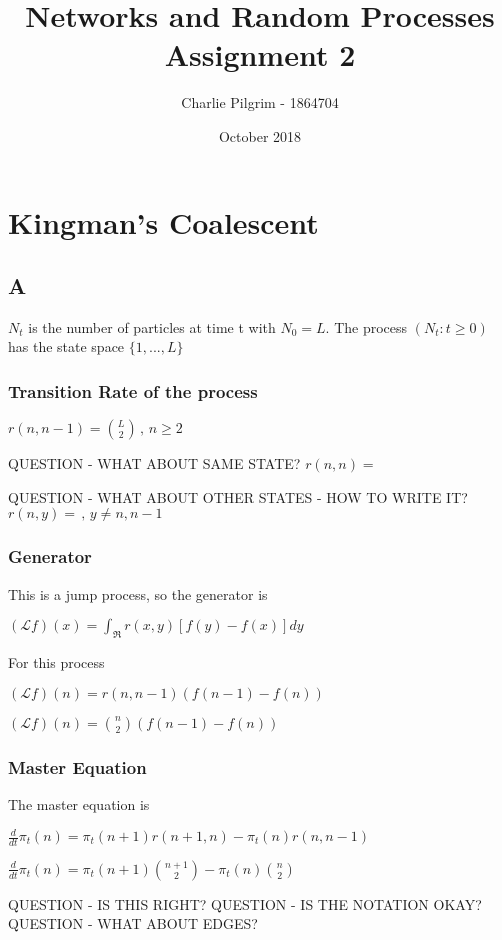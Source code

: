 \documentclass{article}
\title{Networks and Random Processes Assignment 2}
\author{Charlie Pilgrim - 1864704}
\date{October 2018}
\begin{document}
\maketitle


\section{Kingman's Coalescent}

\subsection{A}

$N_t$ is the number of particles at time t with $N_0=L$. The process $(N_t : t \geq 0)$ has the state space $\{1,...,L\}$

\subsubsection{Transition Rate of the process}

$r(n,n-1) = {L\choose 2} \, , \, n \geq 2$ 

QUESTION - WHAT ABOUT SAME STATE?
$r(n,n) = $

QUESTION - WHAT ABOUT OTHER STATES - HOW TO WRITE IT?
$r(n, y) = \, , \, y \neq n,n-1$

\subsubsection{Generator}

This is a jump process, so the generator is

$(\mathcal{L}f)(x) = \int_{\Re} r(x,y)[f(y)-f(x)]dy$

\bigskip

For this process

$(\mathcal{L}f)(n) = r(n,n-1)(f(n-1)-f(n))$

$(\mathcal{L}f)(n) = {n\choose 2} (f(n-1)-f(n))$

\subsubsection{Master Equation}

The master equation is

$\frac{d}{dt} \pi_t(n) = \pi_t(n+1)r(n+1,n) - \pi_t(n)r(n,n-1)$

$\frac{d}{dt} \pi_t(n) = \pi_t(n+1){n+1\choose 2} - \pi_t(n) {n \choose 2}$

QUESTION - IS THIS RIGHT?
QUESTION - IS THE NOTATION OKAY?
QUESTION - WHAT ABOUT EDGES? 
\end{document}
